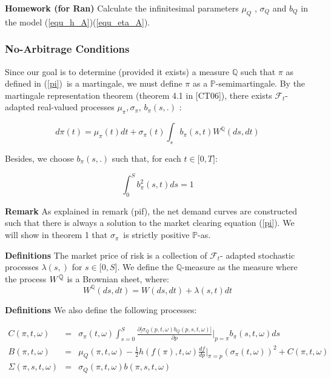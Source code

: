 \documentclass{article}
\begin{document}
\bigskip

\textbf{Homework (for Ran) }Calculate the infinitesimal parameters $\mu _{Q}$%
, $\sigma _{Q}$ and $b_{Q}$ in the model (\ref{equ_h_A})(\ref{equ_eta_A}).

\subsubsection{No-Arbitrage Conditions}

Since our goal is to determine (provided it exists) a measure $\mathbb{Q}$
such that $\pi $ as defined in (\ref{pi})\ is a martingale, we must define $%
\pi $ as a $\mathbb{P}$-semimartingale. By the martingale representation
theorem (theorem 4.1 in [CT06]), there exists $\mathcal{F}_{t}$-adapted
real-valued processes $\mu _{\pi },\sigma _{\pi }$, $b_{\pi }(s,.)$ :

\begin{equation*}
d\pi (t)=\mu _{\pi }(t)dt+\sigma _{\pi }(t)\int_{s}b_{\pi }(s,t)W^{\mathbb{Q}%
}(ds,dt)
\end{equation*}

Besides, we choose $b_{\pi }(s,.)$ such that, for each $t\in \lbrack 0,T]$:

\begin{equation*}
\int_{0}^{S}b_{\pi }^{2}(s,t)ds=1
\end{equation*}

\textbf{Remark} As explained in remark (pif), the net demand curves are
constructed such that there is always a solution to the market clearing
equation (\ref{pi}). We will show in theorem 1 that $\sigma _{\pi }$\ is
strictly positive $\mathbb{P}$-as.

\bigskip

\textbf{Definitions} The market price of risk is a collection of $\mathcal{F}%
_{t}$- adapted stochastic processes $\lambda (s,)$ for $s\in \lbrack 0,S]$.
We define the $\mathbb{Q}$-measure as the measure where the process $W^{%
\mathbb{Q}}$ is a Brownian sheet, where:%
\begin{equation}
W^{\mathbb{Q}}(ds,dt)=W(ds,dt)+\lambda (s,t)dt  \label{WQ}
\end{equation}

\textbf{Definitions }We also define the following processes:

\begin{eqnarray*}
C(\pi ,t,\omega ) &=&\sigma _{\pi }(t,\omega )\int_{s=0}^{S}\frac{\partial
\lbrack \sigma _{Q}(p,t,\omega )b_{Q}(p,s,t,\omega )]}{\partial p}|_{p=\pi
}b_{\pi }(s,t,\omega )ds \\
B(\pi ,t,\omega ) &=&\mu _{Q}(\pi ,t,\omega )-\frac{1}{2}h(f(\pi ),t,\omega )%
\frac{df}{dp}|_{\pi =p}(\sigma _{\pi }(t,\omega ))^{2}+C(\pi ,t,\omega ) \\
\Sigma (\pi ,s,t,\omega ) &=&\sigma _{Q}(\pi ,t,\omega )b(\pi ,s,t,\omega )
\end{eqnarray*}
\end{document}
